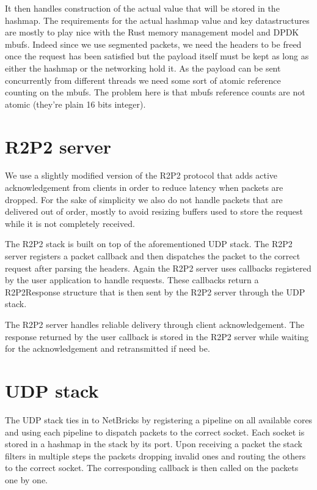 It then handles construction of the actual value that will be stored
in the hashmap. The requirements for the actual hashmap value and key
datastructures are mostly to play nice with the Rust memory management
model and DPDK mbufs. Indeed since we use segmented packets, we need
the headers to be freed once the request has been satisfied but the
payload itself must be kept as long as either the hashmap or the
networking hold it. As the payload can be sent concurrently from
different threads we need some sort of atomic reference counting on
the mbufs. The problem here is that mbufs reference counts are not
atomic (they're plain 16 bits integer).

\section{R2P2 server}

We use a slightly modified version of the R2P2 protocol that adds
active acknowledgement from clients in order to reduce latency when
packets are dropped. For the sake of simplicity we also do not handle
packets that are delivered out of order, mostly to avoid resizing
buffers used to store the request while it is not completely
received.

The R2P2 stack is built on top of the aforementioned UDP stack. The
R2P2 server registers a packet callback and then dispatches the packet
to the correct request after parsing the headers. Again the R2P2
server uses callbacks registered by the user application to handle
requests. These callbacks return a R2P2Response structure that is then
sent by the R2P2 server through the UDP stack.

The R2P2 server handles reliable delivery through client
acknowledgement. The response returned by the user callback is stored
in the R2P2 server while waiting for the acknowledgement and
retransmitted if need be.

\section{UDP stack}

The UDP stack ties in to NetBricks by registering a pipeline on all
available cores and using each pipeline to dispatch packets to the
correct socket. Each socket is stored in a hashmap in the stack by its
port. Upon receiving a packet the stack filters in multiple steps the
packets dropping invalid ones and routing the others to the correct
socket. The corresponding callback is then called on the packets one
by one.

